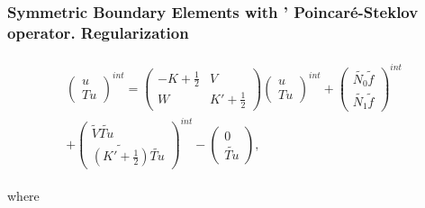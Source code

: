 \subsubsection{Symmetric Boundary Elements with ' Poincar\'e-Steklov operator. Regularization}
\begin{eqnarray}
\begin{array}{c}
\left( \begin{array}{l}
 u \\
 Tu
 \end{array}
 \right)^{int}=\left( \begin{array}{cc}
 -K+\frac{1}{2} & V \\
 W & K'+\frac{1}{2}
 \end{array}
 \right)
 \left( \begin{array}{l}
  u \\
  Tu
 \end{array}
 \right)^{int}
 +\left( \begin{array}{l}
  \widetilde{N_0}\widetilde{f} \\
  \widetilde{N_1}\widetilde{f}
 \end{array}
 \right)^{int} \\[4ex]
+\left( \begin{array}{l}
  \widetilde{V}\widetilde{Tu} \\
  \widetilde{(K'+\frac{1}{2})}\widetilde{Tu}
 \end{array}
 \right)^{int}
-\left( \begin{array}{l}
  0 \\
\widetilde{Tu}
 \end{array}
 \right),
\end{array} \nonumber
\end{eqnarray}

where

